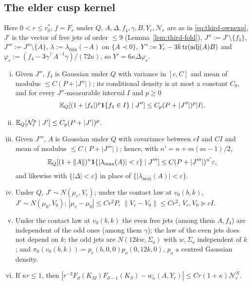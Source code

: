 \subsection{The elder cusp kernel}\label{ssec:third-eldercusp}

Here $0<r\le r_0^*$, $f=F_r$ under $Q$, $A,\Delta,f_4,\gamma,B,Y_r,\mathcal N_r$ are as in \eqref{eq:third-ownexp}, $J'$ is the vector of free jets of order $\le9$ (Lemma~\ref{lem:third-fold}), $J'':=J'\setminus\{f_4\}$, $J''':=J''\setminus\{A\}$, $\lambda:=\lambda_{\min}(-A)$ on $\{A\prec0\}$, $Y':=Y_r-3k\operatorname{tr}(\operatorname{adj}(A)B)$ and $\varphi_r:=(f_4-3\gamma^\top A^{-1}\gamma)/(72\kappa)$, so $Y'=6\kappa\Delta\varphi_r$.

\begin{lemma}\label{lem:third-facts}
\begin{enumerate}[(i),leftmargin=2em]
\item Given $J''$, $f_4$ is Gaussian under $Q$ with variance in $[c,C]$ and mean of modulus $\le C(P+|J''|)$; its conditional density is at most a constant $C_0$, and for every $J''$-measurable interval $I$ and $p\ge0$
\begin{equation}\label{eq:third-f4}
\mathbb E_Q[(1+|f_4|)^p\mathbf 1\{f_4\in I\}\mid J'']\le C_p(P+|J''|)^p|I|.
\end{equation}
\item $\mathbb E_Q[\mathcal N_r^p\mid J']\le C_p(P+|J'|)^p$.
\item Given $J'''$, $A$ is Gaussian under $Q$ with covariance between $cI$ and $CI$ and mean of modulus $\le C(P+|J'''|)$; hence, with $n'=n+m(m-1)/2$,
\begin{equation}\label{eq:third-Alayer}
\mathbb E_Q[(1+\|A\|)^n\mathbf 1\{|\lambda_{\max}(A)|<\varepsilon\}\mid J''']\le C(P+|J'''|)^{n'}\varepsilon,
\end{equation}
and likewise with $\{|\Delta|<\varepsilon\}$ in place of $\{|\lambda_{\max}(A)|<\varepsilon\}$.
\item Under $Q$, $J'\sim N(\mu_r,V_r)$; under the contact law at $v_0(b,k)$, $J'\sim N(\mu_0,V_0)$; $|\mu_r-\mu_0|\le Cr^2P$, $\|V_r-V_0\|\le Cr^2$, $V_r,V_0\succeq cI$.
\item Under the contact law at $v_0(b,k)$ the even free jets (among them $A,f_4$) are independent of the odd ones (among them $\gamma$); the law of the even jets does not depend on $k$; the odd jets are $N(12kw,\Sigma_o)$ with $w,\Sigma_o$ independent of $k$; and $\pi_0(v_0(b,k))=p_e(b,0,0)p_o(0,12k,0)$, $p_o$ a centred Gaussian density.
\item If $\kappa r\le1$, then $|r^{-2}F_d(K_M)F_{d-1}(K_S)-w_\kappa(A,Y_r)|\le Cr(1+\kappa)\mathcal N_r^N$.
\end{enumerate}
\end{lemma}

